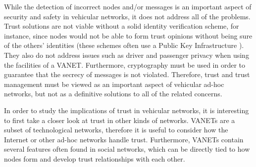 
While the detection of incorrect nodes and/or messages is an important aspect of security and safety in vehicular networks, it does not address all of the problems.
Trust solutions are not viable without a solid identity verification scheme, for instance, since nodes would not be able to form trust opinions without being sure of the others' identities (these schemes often use a Public Key Infrastructure \citep{wasef2010complementing}).
They also do not address issues such as driver and passenger privacy when using the facilities of a VANET.
Furthermore, cryptography must be used in order to guarantee that the secrecy of messages is not violated.
Therefore, trust and trust management must be viewed as an important aspect of vehicular ad-hoc networks, but not as a definitive solutions to all of the related concerns.

In order to study the implications of trust in vehicular networks, it is interesting to first take a closer look at trust in other kinds of networks.
VANETs are a subset of technological networks, therefore it is useful to consider how the Internet or other ad-hoc networks handle trust.
Furthermore, VANETs contain several features often found in social networks, which can be directly tied to how nodes form and develop trust relationships with each other.


